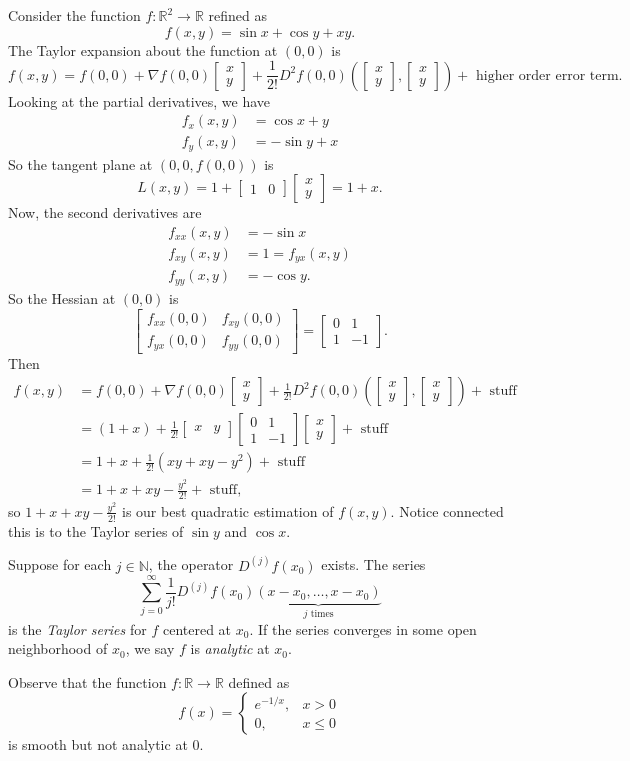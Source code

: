 \documentclass[11pt]{article}
\theoremstyle{definition}
\newcommand{\R}{\mathbb{R}}                      %
\newcommand{\N}{\mathbb{N}}
\newcommand{\mat}{\begin{bmatrix}}
\newcommand{\trix}{\end{bmatrix}}
\begin{document}
\ex Consider the function $f:\R^2\to \R$ refined as 
$$
f(x,y)=\sin x+\cos y +xy.
$$
The Taylor expansion about the function at $(0,0)$ is
$$
f(x,y)=f(0,0)+\nabla f(0,0)\mat x \\ y\trix +\frac{1}{2!}D^2 f(0,0)\left(\mat x \\ y \trix, \mat x \\ y \trix\right)+\mbox{ higher order error term}.
$$
Looking at the partial derivatives, we have
$$
\begin{aligned}
f_x(x,y)&=\cos x +y\\
f_y(x,y)&=-\sin y +x
\end{aligned}
$$
So the tangent plane at $(0,0,f(0,0))$ is
$$
L(x,y)=1+\mat 1 & 0 \trix \mat x \\ y \trix = 1+x.
$$
Now, the second derivatives are
$$
\begin{aligned}
    f_{xx}(x,y)&=-\sin x\\
    f_{xy}(x,y)&=1=f_{yx}(x,y)\\
    f_{yy}(x,y)&=-\cos y.
\end{aligned}
$$
So the Hessian at $(0,0)$ is
$$
\mat f_{xx}(0,0) & f_{xy} (0,0) \\ f_{yx}(0,0) & f_{yy}(0,0)\trix=\mat 0 & 1 \\ 1 & -1 \trix.
$$
Then 
$$
\begin{aligned}
    f(x,y)&=f(0,0)+\nabla f(0,0)\mat x \\ y\trix +\frac{1}{2!}D^2 f(0,0)\left(\mat x \\ y \trix, \mat x \\ y \trix\right)+\mbox{ stuff}\\
    &=(1+x)+\frac{1}{2!}\mat x & y \trix \mat 0 & 1 \\ 1 & -1 \trix\mat x\\ y\trix+\mbox{ stuff}\\
    &=1+x+\frac{1}{2!}(xy+xy-y^2)+\mbox{ stuff}\\
    &=1+x+xy-\frac{y^2}{2!}+\mbox{ stuff},
\end{aligned}
$$
so $1+x+xy-\frac{y^2}{2!}$ is our best quadratic estimation of $f(x,y)$. Notice connected this is to the Taylor series of $\sin y$ and $\cos x$.

\begin{mdframed}[backgroundcolor = blue!10]
\vspace{+0.1cm}
 Suppose for each $j\in\N$, the operator $D^{(j)}f(x_0)$ exists. The series
$$
\sum_{j=0}^\infty \frac{1}{j!} D^{(j)}f(x_0)\underbrace{(x-x_0,\dots,x-x_0)}_{j\mbox{ times}}
$$
is the \textit{Taylor series} for $f$ centered at $x_0$. If the series converges in some open neighborhood of $x_0$, we say $f$ is \textit{analytic} at $x_0$.
\end{mdframed}
\ex Observe that the function $f:\R\to \R$ defined as
$$
f(x)=\begin{cases}
e^{-1/x},&x>0\\
0,&x\leq 0
\end{cases}
$$
is smooth but not analytic at 0.
\end{document}
